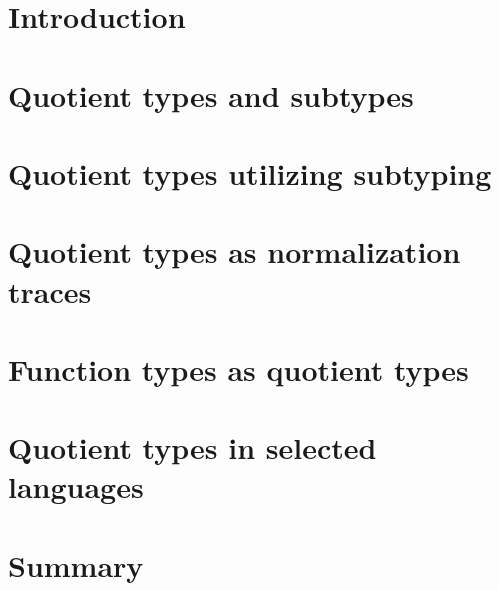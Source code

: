 \documentclass[shortabstract, mgr, english]{iithesis}
\author         {Marek Bauer}
\begin{document}

    \chapter{Introduction}
	
	
    \chapter{Quotient types and subtypes}
	

    \chapter{Quotient types utilizing subtyping}
	

    \chapter{Quotient types as normalization traces}
	

    \chapter{Function types as quotient types}
	

    \chapter{Quotient types in selected languages}
	

    \chapter{Summary}
	

        
%	     
	
\end{document}
